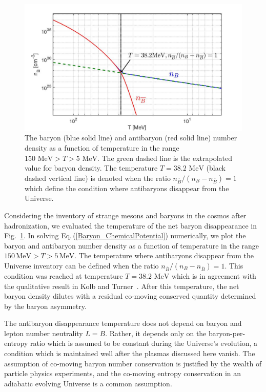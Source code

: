 \documentclass[universe,article,submit,moreauthors,pdftex,a4paper]{Definitions/mdpi}
\newcommand{\MeV}{\text{ MeV}}
\newcommand{\req}[1]{Eq.\,(\ref{#1})}
\newcommand*{\rf}[1]{Fig.~{\ref{#1}}}
\begin{document}
\begin{figure}[h]
\centering
\includegraphics[width=\textwidth]{./plots/Baryon_Antibaryon_cm.jpg}
\caption{The baryon (blue solid line) and antibaryon (red solid line) number density as a function of temperature in the range $150\MeV>T>5\MeV$. The green dashed line is the extrapolated value for baryon density. The temperature $T=38.2\MeV$ (black dashed vertical line) is denoted when the ratio $n_{\overline B}/(n_B-n_{\overline B})=1$ which define the condition where antibaryons disappear from the Universe.}
\label{Baryon_fig}
\end{figure}

Considering the inventory of strange mesons and baryons in the cosmos after hadronization, we evaluated the temperature of the net baryon disappearance in \rf{Baryon_fig}. In solving \req{Baryon_ChemicalPotential} numerically, we plot the baryon and antibaryon number density as a function of temperature in the range $150\,\mathrm{MeV}>T>5\,\mathrm{MeV}$. The temperature where antibaryons disappear from the Universe inventory can be defined when the ratio $n_{\overline B}/(n_B-n_{\overline B})=1$. This condition was reached at temperature $T=38.2\MeV$ which is in agreement with the qualitative result in Kolb and Turner~\cite{kolb1990early}. After this temperature, the net baryon density dilutes with a residual co-moving conserved quantity determined by the baryon asymmetry.

The antibaryon disappearance temperature does not depend on baryon and lepton number neutrality $L=B$. Rather, it depends only on the baryon-per-entropy ratio which is assumed to be constant during the Universe's evolution, a condition which is maintained well after the plasmas discussed here vanish. The assumption of co-moving baryon number conservation is justified by the wealth of particle physics experiments, and the co-moving entropy conservation in an adiabatic evolving Universe is a common assumption.
\end{document}
